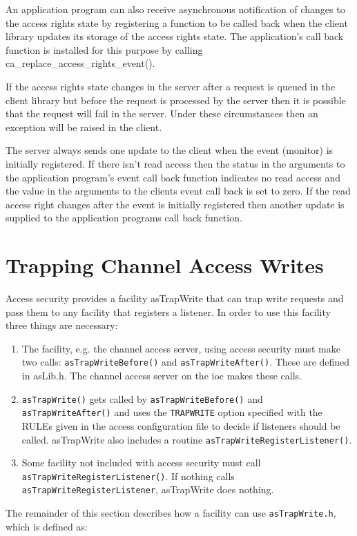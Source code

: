 An application program can also receive asynchronous notification of changes to the access rights state by registering a 
function to be called back when the client library updates its storage of the access rights state. The application's call back 
function is installed for this purpose by calling ca\_replace\_access\_rights\_event().

If the access rights state changes in the server after a request is queued in the client library but before the request is 
processed by the server then it is possible that the request will fail in the server. Under these circumstances then an 
exception will be raised in the client.

The server always sends one update to the client when the event (monitor) is initially registered. If there isn't read access 
then the status in the arguments to the application program's event call back function indicates no read access and the 
value in the arguments to the clients event call back is set to zero. If the read access right changes after the event is 
initially registered then another update is supplied to the application programs call back function.

\section{Trapping Channel Access Writes}

Access security provides a facility asTrapWrite that can trap write requests and pass them to any facility that registers a 
listener. In order to use this facility three things are necessary:

\begin{enumerate}\item The facility, e.g. the channel access server, using access security must make two calls: \verb|asTrapWriteBefore()| 
and \verb|asTrapWriteAfter()|. These are defined in asLib.h. The channel access server on the ioc makes these 
calls. 

\item \verb|asTrapWrite()| gets called by \verb|asTrapWriteBefore()| and\verb| asTrapWriteAfter()| and uses the 
\verb|TRAPWRITE| option specified with the RULEs given in the access configuration file to decide if listeners should be 
called. asTrapWrite also includes a routine \verb|asTrapWriteRegisterListener()|.

\item Some facility not included with access security must call \verb|asTrapWriteRegisterListener()|. If nothing 
calls  \verb|asTrapWriteRegisterListener|, asTrapWrite does nothing.

\end{enumerate}
The remainder of this section describes how a facility can use \verb|asTrapWrite.h|, which is defined as:

